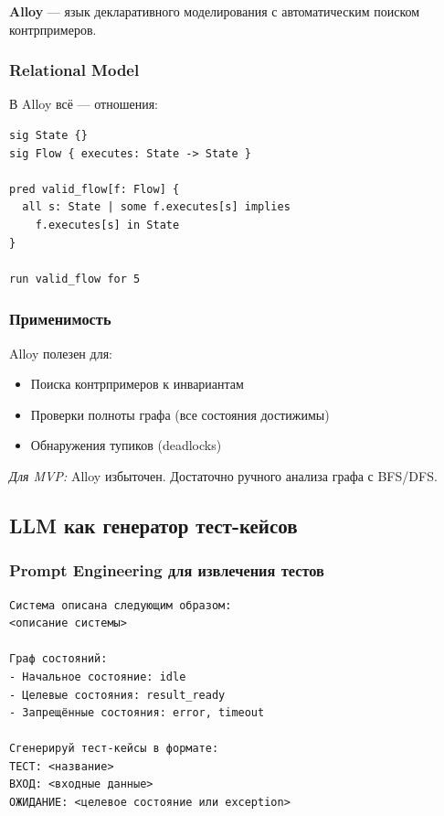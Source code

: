 \documentclass[12pt, a4paper, twoside]{article}
\begin{document}
\textbf{Alloy} --- язык декларативного моделирования с автоматическим
поиском контрпримеров.

\subsubsection{Relational Model}

В Alloy всё --- отношения:

\begin{lstlisting}[language={},caption={Пример Alloy-спецификации}]
sig State {}
sig Flow { executes: State -> State }

pred valid_flow[f: Flow] {
  all s: State | some f.executes[s] implies
    f.executes[s] in State
}

run valid_flow for 5
\end{lstlisting}

\subsubsection{Применимость}

Alloy полезен для:
\begin{itemize}[leftmargin=1.5em]
  \item Поиска контрпримеров к инвариантам
  \item Проверки полноты графа (все состояния достижимы)
  \item Обнаружения тупиков (deadlocks)
\end{itemize}

\textit{Для MVP:} Alloy избыточен. Достаточно ручного анализа графа
с BFS/DFS.

\subsection{LLM как генератор тест-кейсов}

\subsubsection{Prompt Engineering для извлечения тестов}

\begin{lstlisting}[language={},caption={Промпт для генерации тестов из описания}]
Система описана следующим образом:
<описание системы>

Граф состояний:
- Начальное состояние: idle
- Целевые состояния: result_ready
- Запрещённые состояния: error, timeout

Сгенерируй тест-кейсы в формате:
ТЕСТ: <название>
ВХОД: <входные данные>
ОЖИДАНИЕ: <целевое состояние или exception>
\end{lstlisting}
\end{document}
